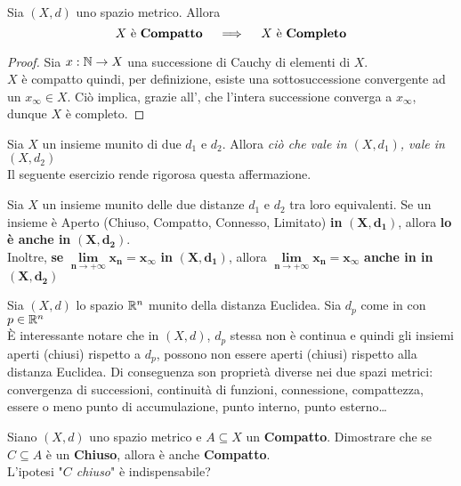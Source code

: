 \begin{proposition}
	\label{prop:X_compat_allora_X_compl}
	Sia $(X,d)$ uno spazio metrico. Allora
	\[X \text{ è \textbf{Compatto}} \quad \implies \quad X \text{ è \textbf{Completo}}\]
	\begin{proof}
		Sia $x: \mathbb{N} \to X$ una successione di Cauchy di elementi di $X$.\\
		$X$ è compatto quindi, per definizione, esiste una sottosuccessione convergente ad un $x_\infty \in X$. Ciò implica, grazie all', che l'intera successione converga a $x_\infty$, dunque $X$ è completo.
	\end{proof}
\end{proposition}

\begin{observation}
	Sia $X$ un insieme munito di due  $d_1$ e $d_2$. Allora \textit{ciò che vale in $(X, d_1)$, vale in $(X, d_2)$}\\
	Il seguente esercizio rende rigorosa questa affermazione.
\end{observation}
\begin{exercise}
	\label{ex:dist_eqiv}
	Sia $X$ un insieme munito delle due distanze $d_1$ e $d_2$ tra loro equivalenti. Se un insieme è Aperto (Chiuso, Compatto, Connesso, Limitato) \textbf{in} $\boldsymbol{(X,d_1)}$, allora \textbf{lo è anche in} $\boldsymbol{(X,d_2)}$.\\
	Inoltre, \textbf{se} $\boldsymbol{\lim\limits_{n \to +\infty} x_n = x_\infty}$ \textbf{in} $\boldsymbol{(X,d_1)}$, allora $\boldsymbol{\lim\limits_{n \to +\infty} x_n = x_\infty}$ \textbf{anche in in} $\boldsymbol{(X,d_2)}$
\end{exercise}
\begin{example}
	Sia $(X,d)$ lo spazio $\mathbb{R}^n$ munito della distanza Euclidea. Sia $d_p$ come in \hyperref[ex:dist_parigi]{} con $p \in \mathbb{R}^n$\\
	È interessante notare che in $(X,d)$, $d_p$ stessa non è continua e quindi gli insiemi aperti (chiusi) rispetto a $d_p$, possono non essere aperti (chiusi) rispetto alla distanza Euclidea. Di conseguenza son proprietà diverse nei due spazi metrici: convergenza di successioni, continuità di funzioni, connessione, compattezza, essere o meno punto di accumulazione, punto interno, punto esterno\dots
\end{example}
\begin{exercise}
	Siano $(X,d)$ uno spazio metrico e $A \subseteq X$ un \textbf{Compatto}. Dimostrare che se $C \subseteq A$ è un \textbf{Chiuso}, allora è anche \textbf{Compatto}.\\
	L'ipotesi "\textit{$C$ chiuso}" è indispensabile? 
\end{exercise}

